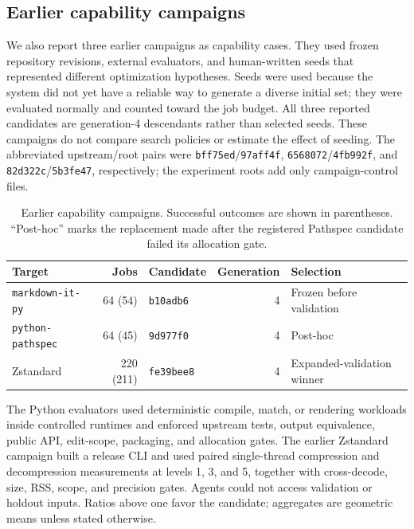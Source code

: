 \documentclass[10pt,twocolumn]{article}
\newcommand{\code}[1]{\texttt{#1}}
\begin{document}
\subsection{Earlier capability campaigns}

We also report three earlier campaigns as capability cases. They used frozen
repository revisions, external evaluators, and human-written seeds that
represented different optimization hypotheses. Seeds were used because the
system did not yet have a reliable way to generate a diverse initial set; they
were evaluated normally and counted toward the job budget. All three reported
candidates are generation-4 descendants rather than selected seeds. These
campaigns do not compare search policies or estimate the effect of seeding.
The abbreviated upstream/root pairs were \code{bff75ed}/\code{97aff4f},
\code{6568072}/\code{4fb992f}, and \code{82d322c}/\code{5b3fe47}, respectively;
the experiment roots add only campaign-control files.

\begin{table}[t]
  \centering
  \caption{Earlier capability campaigns. Successful outcomes are shown in
  parentheses. ``Post-hoc'' marks the replacement made after the registered
  Pathspec candidate failed its allocation gate.}
  \label{tab:campaigns}
  \begin{tabularx}{\textwidth}{@{}Y r P{0.20\textwidth}r P{0.25\textwidth}@{}}
    \toprule
    Target & Jobs & Candidate & Generation & Selection \\
    \midrule
    \code{markdown-it-py} & 64 (54) & \code{b10adb6} & 4 & Frozen before validation \\
    \code{python-pathspec} & 64 (45) & \code{9d977f0} & 4 & Post-hoc \\
    Zstandard & 220 (211) & \code{fe39bee8} & 4 & Expanded-validation winner \\
    \bottomrule
  \end{tabularx}
\end{table}

The Python evaluators used deterministic compile, match, or rendering workloads
inside controlled runtimes and enforced upstream tests, output equivalence,
public API, edit-scope, packaging, and allocation gates. The earlier Zstandard
campaign built a release CLI and used paired single-thread compression and
decompression measurements at levels 1, 3, and 5, together with cross-decode,
size, RSS, scope, and precision gates. Agents could not access validation or
holdout inputs. Ratios above one favor the candidate; aggregates are geometric
means unless stated otherwise.
\end{document}
